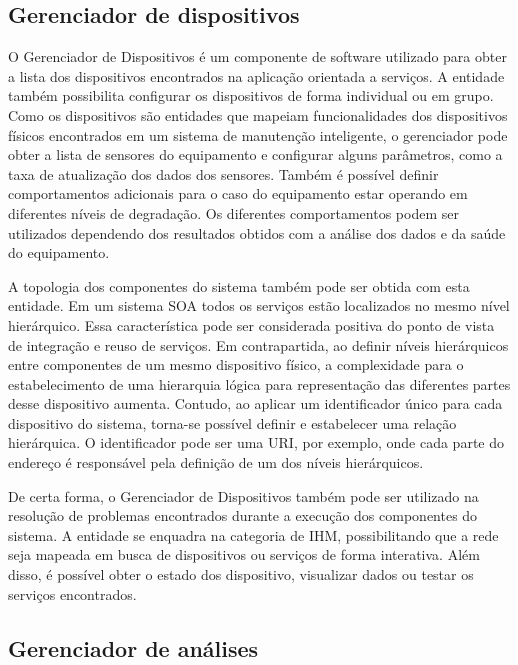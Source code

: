 \subsection{Gerenciador de dispositivos}

O Gerenciador de Dispositivos  é um
componente de software utilizado para obter a lista dos dispositivos encontrados na aplicação
orientada a serviços. A entidade também possibilita configurar os dispositivos de forma individual
ou em grupo. Como os dispositivos são entidades que mapeiam funcionalidades dos dispositivos físicos
encontrados em um sistema de manutenção inteligente, o gerenciador pode obter a lista de sensores do
equipamento e configurar alguns parâmetros, como a taxa de atualização dos dados dos sensores.
Também é possível definir comportamentos adicionais para o caso do equipamento estar operando em
diferentes níveis de degradação. Os diferentes comportamentos podem ser utilizados dependendo dos
resultados obtidos com a análise dos dados e da saúde do equipamento.

A topologia dos componentes do sistema também pode ser obtida com esta entidade. Em um sistema
\gls{SOA} todos os serviços estão localizados no mesmo nível hierárquico. Essa característica pode
ser considerada positiva do ponto de vista de integração e reuso de serviços. Em contrapartida, ao
definir níveis hierárquicos entre componentes de um mesmo dispositivo físico, a complexidade para o
estabelecimento de uma hierarquia lógica para representação das diferentes partes desse dispositivo
aumenta. Contudo, ao aplicar um identificador único para cada dispositivo do sistema, torna-se
possível definir e estabelecer uma relação hierárquica. O identificador pode ser uma \gls{URI}, por
exemplo, onde cada parte do endereço é responsável pela definição de um dos níveis hierárquicos.

De certa forma, o Gerenciador de Dispositivos também pode ser utilizado na resolução de problemas
encontrados durante a execução dos componentes do sistema. A entidade se enquadra na categoria de
\gls{IHM}, possibilitando que a rede seja mapeada em busca de dispositivos ou serviços de forma
interativa. Além disso, é possível obter o estado dos dispositivo, visualizar dados ou testar os
serviços encontrados.


\subsection{Gerenciador de análises}

